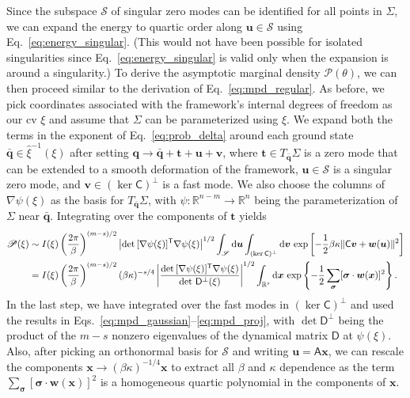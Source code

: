 Since the subspace $\mathscr{S}$ of singular zero modes can be identified for all points in $\Sigma$, we can expand the energy to quartic order along $\bm{u} \in \mathscr{S}$ using Eq.~\eqref{eq:energy_singular}.
(This would not have been possible for isolated singularities since Eq.~\eqref{eq:energy_singular} is valid only when the expansion is around a singularity.)
To derive the asymptotic marginal density $\mathscr{P}(\theta)$, we can then proceed similar to the derivation of Eq.~\eqref{eq:mpd_regular}.
As before, we pick coordinates associated with the framework's internal degrees of freedom as our \ac{cv} $\xi$ and assume that $\Sigma$ can be parameterized using $\xi$.
We expand both the terms in the exponent of Eq.~\eqref{eq:prob_delta} around each ground state $\bar{\bm{q}} \in \hat{\xi}^{-1}(\xi)$ after setting $\bm{q} \to \bar{\bm{q}} + \bm{t} + \bm{u} + \bm{v}$, where $\bm{t} \in T_{\bar{\bm{q}}}\Sigma$ is a zero mode that can be extended to a smooth deformation of the framework, $\bm{u} \in \mathscr{S}$ is a singular zero mode, and $\bm{v} \in (\ker\mathsf{C})^{\perp}$ is a fast mode.
We also choose the columns of $\nabla\psi(\xi)$ as the basis for $T_{\bar{\bm{q}}}\Sigma$, with $\psi: \mathbb{R}^{n-m} \to \mathbb{R}^{n}$ being the parameterization of $\Sigma$ near $\bar{\bm{q}}$.
Integrating over the components of $\bm{t}$ yields
%
\begin{equation}
  \begin{aligned}
    \mathscr{P}(\xi) &\sim I(\xi)\left(\frac{2\pi}{\beta}\right)^{(m - s)/2} \left|\det\,[\nabla\psi(\xi)]^\mathsf{T}\nabla\psi(\xi)\right|^{1/2} \int_{\mathscr{S}} \mathrm{d}\bm{u} \int_{(\ker\mathsf{C})^{\perp}} \mathrm{d}\bm{v}\, \exp\left[-\frac{1}{2}\beta\kappa\lVert\mathsf{C}\bm{v} + \bm{w}(\bm{u})\rVert^{2}\right]\\
                                 &= I(\xi)\left(\frac{2\pi}{\beta}\right)^{(m - s)/2}(\beta\kappa)^{-s/4} \left|\frac{\det\,[\nabla\psi(\xi)]^\mathsf{T}\nabla\psi(\xi)}{\det\,\mathsf{D}^{\perp}(\xi)}\right|^{1/2} \int_{\mathbb{R}^{s}} \mathrm{d}\bm{x}\, \exp\left\{-\frac{1}{2}\sum_{\bm{\sigma}}[\bm{\sigma}\cdot\bm{w}(\bm{x})]^{2}\right\}.
  \end{aligned}
  \label{eq:mpd_perm}
\end{equation}
%
In the last step, we have integrated over the fast modes in $(\ker\mathsf{C})^{\perp}$ and used the results in Eqs.~\eqref{eq:mpd_gaussian}--\eqref{eq:mpd_proj}, with $\det\mathsf{D}^{\perp}$ being the product of the $m-s$ nonzero eigenvalues of the dynamical matrix $\mathsf{D}$ at $\psi(\xi)$.
Also, after picking an orthonormal basis for $\mathscr{S}$ and writing $\bm{u} = \mathsf{A}\bm{x}$, we can rescale the components $\bm{x} \to (\beta\kappa)^{-1/4}\bm{x}$ to extract all $\beta$ and $\kappa$ dependence as the term $\sum_{\bm{\sigma}} [\bm{\sigma}\cdot \bm{w}(\bm{x})]^{2}$ is a homogeneous quartic polynomial in the components of $\bm{x}$.
